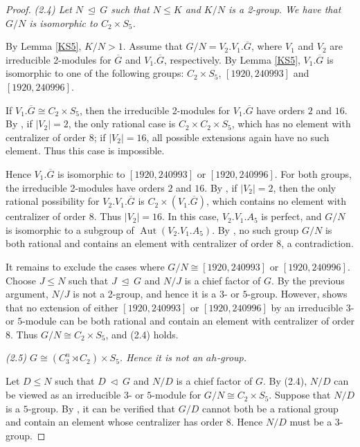 \documentclass[11pt]{article}
\providecommand{\teq}{{\ \trianglelefteq \ }}
\providecommand{\te}{{\ \triangleleft \ }}
\providecommand{\Aut}{{\operatorname{Aut}}}
\providecommand{\olG}{{\overline{G}}}
\begin{document}
\begin{proof}
\medskip
{\sl (2.4) Let $N\teq G$ such that $N\leq K$ and $K/N$ is a 2-group.
    We have that $G/N$ is isomorphic to $C_2\times S_5$.} 

    By Lemma \ref{KS5}, $K/N>1$.
    Assume that $G/N = V_2.V_1.\olG$, 
    where $V_1$ and $V_2$ are irreducible 2-modules for $\olG$ and $V_1.\olG$, respectively.
    By Lemma \ref{KS5},
    $V_1.\olG$ is isomorphic to one of the following groups: 
    $C_2\times S_5$, $[1920, 240993]$ and $[1920, 240996]$.
    
    If $V_1.\olG\cong C_2\times S_5$, then the irreducible 2-modules for
    $V_1.\olG$ have orders $2$ and $16$.
    By \cite[Code 12]{Git}, if $|V_2|=2$, the only rational case is
    $C_2\times C_2\times S_5$, which has no element with centralizer of order $8$;
    if $|V_2|=16$, all possible extensions again have no such element.
    Thus this case is impossible.

    Hence $V_1.\olG$ is isomorphic to $[1920,240993]$ or $[1920,240996]$.
    For both groups, the irreducible 2-modules have orders $2$ and $16$.
    By \cite[Code 13]{Git}, if $|V_2|=2$, 
    then the only rational possibility for $V_2.V_1.\olG$ is
    $C_2\times (V_1.\olG)$, which contains no element with centralizer of order $8$.
    Thus $|V_2|=16$.
    In this case, $V_2.V_1.A_5$ is perfect, and $G/N$ is isomorphic to a subgroup of $\Aut(V_2.V_1.A_5)$.
    By \cite[Code 13]{Git}, no such group $G/N$ is both rational 
    and contains an element with centralizer of order $8$, a contradiction.

    It remains to exclude the cases where $G/N\cong [1920,240993]$ or $[1920,240996]$.
    Choose $J\leq N$ such that $J\teq G$ and $N/J$ is a chief factor of $G$.
    By the previous argument, $N/J$ is not a 2-group, and hence it is a $3$- or $5$-group.
    However, \cite[Code 14]{Git} shows that 
    no extension of either $[1920,240993]$ or $[1920,240996]$ by an irreducible $3$- or $5$-module
    can be both rational and contain an element with centralizer of order $8$.
    Thus $G/N\cong C_2\times S_5$, and (2.4) holds.
    
\medskip
{\sl (2.5) $G\cong (C_3^n\rtimes C_2)\times S_5$. Hence it is not an $ah$-group.}

    Let $D \leq N$ such that $D \te G$ and $N/D$ is a chief factor of $G$. 
    By (2.4), $N/D$ can be viewed as an irreducible $3$- or $5$-module for $G/N \cong C_2 \times S_5$.
    Suppose that $N/D$ is a $5$-group.
    By \cite[Code 15]{Git}, it can be verified that 
    $G/D$ cannot both be a rational group and contain an element whose centralizer has order $8$.
    Hence $N/D$ must be a 3-group.


\end{proof}
\end{document}
